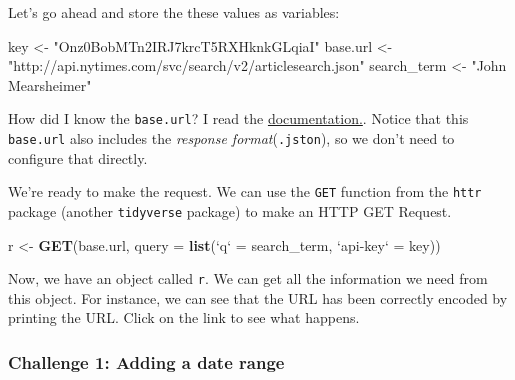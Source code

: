 \documentclass[]{book}
\newenvironment{Shaded}{\begin{snugshade}}{\end{snugshade}}
\newcommand{\CommentTok}[1]{\textcolor[rgb]{0.56,0.35,0.01}{\textit{#1}}}
\newcommand{\DataTypeTok}[1]{\textcolor[rgb]{0.13,0.29,0.53}{#1}}
\newcommand{\KeywordTok}[1]{\textcolor[rgb]{0.13,0.29,0.53}{\textbf{#1}}}
\newcommand{\NormalTok}[1]{#1}
\newcommand{\OperatorTok}[1]{\textcolor[rgb]{0.81,0.36,0.00}{\textbf{#1}}}
\newcommand{\StringTok}[1]{\textcolor[rgb]{0.31,0.60,0.02}{#1}}
\begin{document}
Let's go ahead and store the these values as variables:

\begin{Shaded}
\begin{Highlighting}[]
\NormalTok{key <-}\StringTok{ "Onz0BobMTn2IRJ7krcT5RXHknkGLqiaI"}
\NormalTok{base.url <-}\StringTok{ "http://api.nytimes.com/svc/search/v2/articlesearch.json"}
\NormalTok{search_term <-}\StringTok{ "John Mearsheimer"}
\end{Highlighting}
\end{Shaded}

How did I know the \texttt{base.url}? I read the \href{https://developer.nytimes.com/docs/articlesearch-product/1/routes/articlesearch.json/get}{documentation.}. Notice that this \texttt{base.url} also includes the \emph{response format}(\texttt{.jston}), so we don't need to configure that directly.

We're ready to make the request. We can use the \texttt{GET} function from the \texttt{httr} package (another \texttt{tidyverse} package) to make an HTTP GET Request.

\begin{Shaded}
\begin{Highlighting}[]
\NormalTok{r <-}\StringTok{ }\KeywordTok{GET}\NormalTok{(base.url, }\DataTypeTok{query =} \KeywordTok{list}\NormalTok{(}\StringTok{`}\DataTypeTok{q}\StringTok{`}\NormalTok{ =}\StringTok{ }\NormalTok{search_term,}
                                \StringTok{`}\DataTypeTok{api-key}\StringTok{`}\NormalTok{ =}\StringTok{ }\NormalTok{key))}
\end{Highlighting}
\end{Shaded}

Now, we have an object called \texttt{r}. We can get all the information we need from this object. For instance, we can see that the URL has been correctly encoded by printing the URL. Click on the link to see what happens.

\begin{Shaded}
\end{Shaded}

\hypertarget{challenge-1-adding-a-date-range}{%
\subsubsection*{Challenge 1: Adding a date range}\label{challenge-1-adding-a-date-range}}
\end{document}
